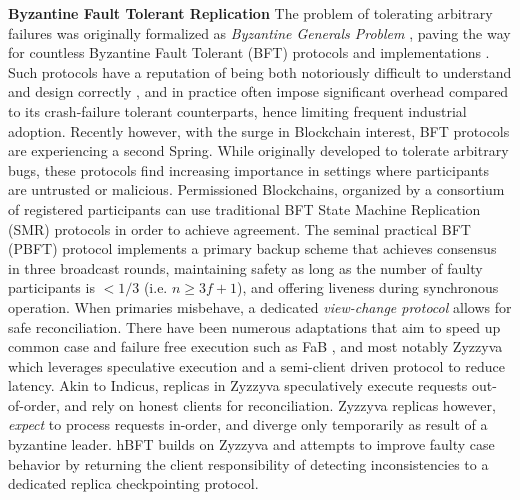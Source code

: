 \textbf{Byzantine Fault Tolerant Replication} 
 The problem of tolerating arbitrary failures was originally formalized as \textit{Byzantine Generals Problem} \cite{lamport2019byzantine}, paving the way for countless Byzantine Fault Tolerant (BFT) protocols and implementations \cite{castro1999practical, martin2006fast, kotla2007zyzzyva, pires2018generalized, bessani2014state, lamport2011byzantizing, arun2019ezbft, malkhi2019flexible, duan2014hbft, yin2003separating}. Such protocols have a reputation of being  both notoriously difficult to understand and design correctly \cite{abraham2017revisiting, abraham2018revisiting, shrestha2019revisiting}, and in practice often impose significant overhead compared to its crash-failure tolerant counterparts, hence limiting frequent industrial adoption.
Recently however, with the surge in Blockchain interest, BFT protocols are experiencing a second Spring. While originally developed to tolerate arbitrary bugs, these protocols find increasing importance in settings where participants are untrusted or malicious. Permissioned Blockchains, organized by a consortium of registered participants can use traditional BFT State Machine Replication (SMR) protocols in order to achieve agreement. 
The seminal practical BFT (PBFT) protocol \cite{castro1999practical} implements a primary backup scheme that achieves consensus in three broadcast rounds, maintaining safety as long as the number of faulty participants is $<1/3$ (i.e. $n\geq 3f+1$), and offering liveness during synchronous operation. When primaries misbehave, a dedicated \textit{view-change protocol} allows for safe reconciliation. There have been numerous adaptations that aim to speed up common case and failure free execution such as FaB \cite{martin2006fast}, and most notably Zyzzyva \cite{kotla2007zyzzyva} which leverages speculative execution and a semi-client driven protocol to reduce latency. Akin to Indicus, replicas in Zyzzyva speculatively execute requests out-of-order, and rely on honest clients for reconciliation. Zyzzyva replicas however, \textit{expect} to process requests in-order, and diverge only temporarily as result of a byzantine leader. hBFT builds on Zyzzyva and attempts to improve faulty case behavior by returning the client responsibility of detecting inconsistencies to a dedicated replica checkpointing protocol. 
